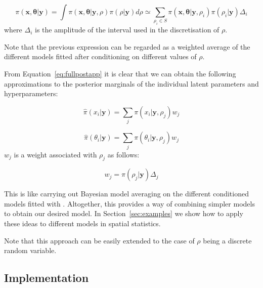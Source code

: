 \documentclass[article]{jss}
\begin{document}
\begin{equation}
\pi(\mathbf{x}, \mathbf{\theta}|\mathbf{y}) = \int \pi(\mathbf{x}, \mathbf{\theta}|\mathbf{y}, \rho)\pi(\rho|\mathbf{y})d\rho
\simeq
\sum_{\rho_i\in S}\pi(\mathbf{x}, \mathbf{\theta}|\mathbf{y}, \rho_i)  
\pi(\rho_i|\mathbf{y}) \Delta_i
\label{eq:fullpostapp}
\end{equation}
\noindent
where $\Delta_i$ is the amplitude of the interval used in the discretisation
of $\rho$.

Note that the previous expression can be regarded as a weighted average
of the different models fitted after conditioning on different values of
$\rho$.

From Equation~\ref{eq:fullpostapp} it is clear that we can obtain the following
approximations to the posterior marginals of the individual latent parameters
and hyperparameters:

\begin{equation}
\hat{\pi}(x_i|\mathbf{y}) = \sum_j \pi(x_i|\mathbf{y}, \rho_j) w_j
\end{equation}

\begin{equation}
\hat{\pi}(\theta_i|\mathbf{y}) = \sum_j \pi(\theta_i|\mathbf{y}, \rho_j) w_j
\end{equation}
\noindent
$w_j$ is a weight associated with $\rho_j$ as follows:

\begin{equation}
w_j = \pi(\rho_j|\mathbf{y})\Delta_j
\end{equation}


This is like carrying out Bayesian model averaging \citep{Hoetingetal:1999} on the
different conditioned models fitted with . Altogether, this
provides a way of combining simpler models to obtain our desired model. In
Section~\ref{sec:examples} we show how to apply these ideas to different models
in spatial statistics.


%

Note that this approach can be easily extended to the case of $\rho$ being
a discrete random variable.


\subsection{Implementation}
\end{document}
